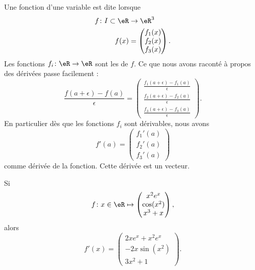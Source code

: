 Une fonction d'une variable est dite  lorsque
\begin{equation}
	\begin{aligned}
		f\colon I\subset \eR & \to \eR^3       \\
		f(x)                 & =\begin{pmatrix}
			                        f_1(x) \\
			                        f_2(x) \\
			                        f_3(x)
		                        \end{pmatrix}.
	\end{aligned}
\end{equation}
Les fonctions \( f_i\colon \eR\to \eR\) sont les  de \( f\). Ce que nous avons raconté à propos des dérivées passe facilement :
\begin{equation}
	\frac{ f(a+\epsilon)-f(a) }{ \epsilon }=
	\begin{pmatrix}
		\frac{ f_1(a+\epsilon)-f_1(a) }{ \epsilon } \\
		\frac{ f_2(a+\epsilon)-f_2(a) }{ \epsilon } \\
		\frac{ f_3(a+\epsilon)-f_3(a) }{ \epsilon }
	\end{pmatrix}.
\end{equation}
En particulier dès que les fonctions \( f_i\) sont dérivables, nous avons
\begin{equation}
	f'(a)=\begin{pmatrix}
		f_1'(a) \\
		f_2'(a) \\
		f_3'(a)
	\end{pmatrix}
\end{equation}
comme dérivée de la fonction. Cette dérivée est un vecteur.

\begin{example}
	Si
	\begin{equation}
		f\colon x\in\eR\mapsto \begin{pmatrix}
			x^2 e^{x} \\
			\cos(x^2) \\
			x^3+x
		\end{pmatrix},
	\end{equation}
	alors
	\begin{equation}
		f'(x)=\begin{pmatrix}
			2xe^x+x^2e^x \\
			-2x\sin(x^2) \\
			3x^2+1
		\end{pmatrix}.
	\end{equation}
\end{example}

